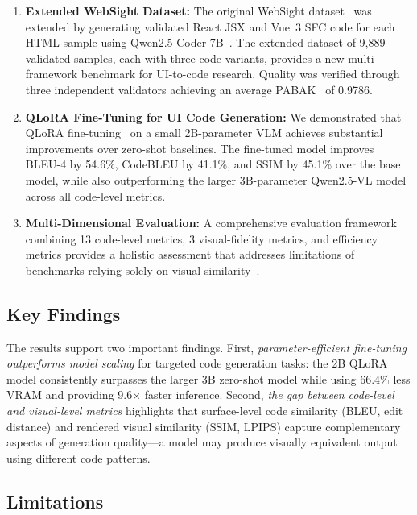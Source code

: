 \begin{enumerate}
    \item \textbf{Extended WebSight Dataset:} The original WebSight dataset~\cite{laurencon2024websight} was extended by generating validated React JSX and Vue~3 SFC code for each HTML sample using Qwen2.5-Coder-7B~\cite{hui2024qwen25coder}. The extended dataset of 9,889 validated samples, each with three code variants, provides a new multi-framework benchmark for UI-to-code research. Quality was verified through three independent validators achieving an average PABAK~\cite{byrt1993pabak} of 0.9786.
    
    \item \textbf{QLoRA Fine-Tuning for UI Code Generation:} We demonstrated that QLoRA fine-tuning~\cite{dettmers2023qlora} on a small 2B-parameter VLM achieves substantial improvements over zero-shot baselines. The fine-tuned model improves BLEU-4 by 54.6\%, CodeBLEU by 41.1\%, and SSIM by 45.1\% over the base model, while also outperforming the larger 3B-parameter Qwen2.5-VL model across all code-level metrics.
    
    \item \textbf{Multi-Dimensional Evaluation:} A comprehensive evaluation framework combining 13 code-level metrics, 3 visual-fidelity metrics, and efficiency metrics provides a holistic assessment that addresses limitations of benchmarks relying solely on visual similarity~\cite{li2024design2code}.
\end{enumerate}

\subsection{Key Findings}

The results support two important findings. First, \textit{parameter-efficient fine-tuning outperforms model scaling} for targeted code generation tasks: the 2B QLoRA model consistently surpasses the larger 3B zero-shot model while using 66.4\% less VRAM and providing 9.6$\times$ faster inference. Second, \textit{the gap between code-level and visual-level metrics} highlights that surface-level code similarity (BLEU, edit distance) and rendered visual similarity (SSIM, LPIPS) capture complementary aspects of generation quality—a model may produce visually equivalent output using different code patterns.

\subsection{Limitations}

